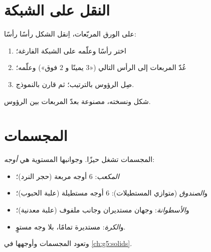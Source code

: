 \section{النقل على الشبكة}

\begin{method}\label{met:g2:shapes:copy}
على الورق المربّعات، اِنقل الشكل رأسًا رأسًا:
\begin{enumerate}
  \item اختر رأسًا وعلّمه على الشبكة الفارغة؛
  \item عُدّ المربعات إلى الرأس التالي («$3$ يمينًا و $2$
        فوق») وعلّمه؛
  \item صِل الرؤوس بالترتيب؛ ثم قارن بالنموذج.
\end{enumerate}
\end{method}

\begin{omfigure}

{\small شكل ونسخته، مصنوعة بعدّ المربعات بين
الرؤوس.}
\end{omfigure}

\section{المجسمات}

\begin{definition}\label{def:g2:shapes:solids}
المجسمات تشغل حيزًا. وجوانبها المستوية هي \emph{أوجه}:
\begin{itemize}
  \item \emph{المكعب}: $6$ أوجه مربعة (حجر النرد)؛
  \item و\emph{الصندوق} (متوازي المستطيلات): $6$ أوجه مستطيلة
        (علبة الحبوب)؛
  \item و\emph{الأسطوانة}: وجهان مستديران وجانب
        ملفوف (علبة معدنية)؛
  \item و\emph{الكرة}: مستديرة تمامًا، بلا وجه مستوٍ.
\end{itemize}
وتعود المجسمات وأوجهها في \cref{ch:g5:solids}.
\end{definition}

